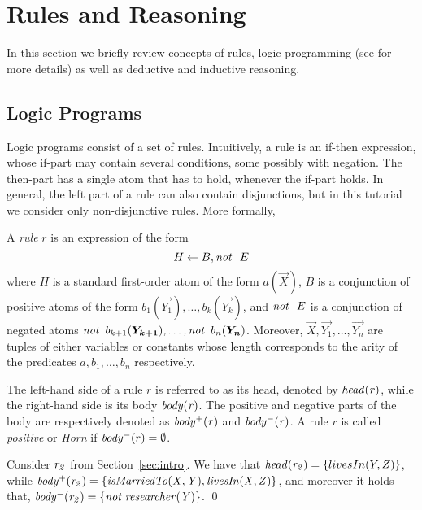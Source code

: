 \section{Rules and Reasoning}
\label{sec:reasoning}
In this section we briefly review concepts of rules, logic programming (see \cite{DBLP:conf/rweb/EiterIK09} for more details) as well as %
deductive and inductive reasoning.

\subsection{Logic Programs} Logic programs consist of a set of rules. Intuitively, a rule is an if-then expression, whose if-part may contain several conditions, some possibly with
negation. The then-part has a single atom that has to hold, whenever the if-part holds. In general, the left part of a rule can also contain disjunctions, but in this tutorial we consider only non-disjunctive rules. More formally,


\begin{definition}[Rule] A \emph{rule} $r$ is an expression of the form
\begin{equation}
H\leftarrow B, \mathit{not}~ \ E
\end{equation}
where $H$ is a standard first-order atom of the form $a(\vec{X})$, $B$ is a conjunction of positive atoms of the form $b_1(\vec{Y_1}),\dotsc,b_k(\vec{Y_k})$, and $\mathit{not}~ \ E$ %
 is a conjunction of negated atoms $\naf\, b_{k+1}(\vec{Y_{k+1}}),\dotsc,\naf\, b_n(\vec{Y_{n}})$. Moreover,  $\vec{X},\vec{Y_1},\ldots,\vec{Y_{n}}$ are tuples of either variables or constants whose length corresponds to the arity of the predicates $a,b_1,\ldots,b_n$ respectively.
\end{definition}

The left-hand side of a rule $r$ is referred to as its head, denoted by $\mathit{head(r)}$, while the right-hand side is its body $\mathit{body(r)}$. The positive and negative parts of the body are respectively denoted as $\mathit{body^+(r)}$ and $\mathit{body^-(r)}$. A rule $r$ is called \emph{positive} or
\emph{Horn} if $\mathit{body^-}(r)=\emptyset$.

\begin{example}
Consider $\mathit{r_2}$ from Section~\ref{sec:intro}. We have that $\mathit{head(r_2)}=\{livesIn(Y,Z)\}$, while $\mathit{body^+(r_2)=\{isMarriedTo(X,Y), livesIn(X,Z)\}}$, and moreover it holds that, $\mathit{body^-(r_2)=\{not\;researcher(Y)\}}$. \qed
\end{example}




